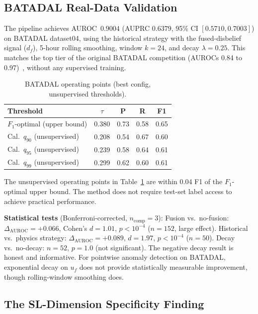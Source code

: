 \documentclass[conference]{IEEEtran}
\begin{document}
\subsection{BATADAL Real-Data Validation}

The pipeline achieves AUROC~$0.9004$ (AUPRC $0.6379$, 95\% CI $[0.5710, 0.7003]$) on BATADAL dataset04, using the historical strategy with the fused-disbelief signal ($d_f$), 5-hour rolling smoothing, window $k=24$, and decay $\lambda=0.25$. This matches the top tier of the original BATADAL competition (AUROCs 0.84 to 0.97)~\cite{taormina2018battle}, without any supervised training.

\begin{table}[t]
\centering
\caption{BATADAL operating points (best config, unsupervised thresholds).}
\label{tab:batadal-ops}
\footnotesize
\begin{tabular}{@{}lcccc@{}}
\toprule
\textbf{Threshold} & $\tau$ & \textbf{P} & \textbf{R} & \textbf{F1} \\
\midrule
$F_1$-optimal (upper bound) & 0.380 & 0.73 & 0.58 & 0.65 \\
Cal.\ $q_{90}$ (unsupervised) & 0.208 & 0.54 & 0.67 & 0.60 \\
Cal.\ $q_{95}$ (unsupervised) & 0.239 & 0.58 & 0.64 & 0.61 \\
Cal.\ $q_{99}$ (unsupervised) & 0.299 & 0.62 & 0.60 & 0.61 \\
\bottomrule
\end{tabular}
\end{table}

The unsupervised operating points in Table~\ref{tab:batadal-ops} are within 0.04 F1 of the $F_1$-optimal upper bound. The method does not require test-set label access to achieve practical performance.

\textbf{Statistical tests} (Bonferroni-corrected, $n_{\text{comp}}=3$):
Fusion vs.\ no-fusion: $\Delta_{\text{AUROC}}=+0.066$, Cohen's $d=1.01$, $p<10^{-4}$ ($n=152$, large effect).
Historical vs.\ physics strategy: $\Delta_{\text{AUROC}}=+0.089$, $d=1.97$, $p<10^{-4}$ ($n=50$).
Decay vs.\ no-decay: $n=52$, $p=1.0$ (not significant). The negative decay result is honest and informative. For pointwise anomaly detection on BATADAL, exponential decay on $u_f$ does not provide statistically measurable improvement, though rolling-window smoothing does.

\subsection{The SL-Dimension Specificity Finding}
\end{document}
